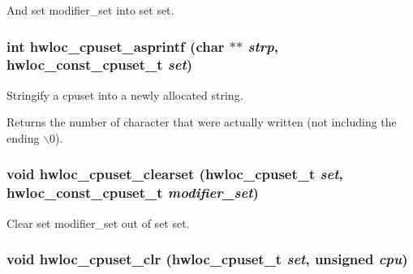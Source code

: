 And set {\ttfamily modifier\_\-set} into set {\ttfamily set}. \hypertarget{group__hwlocality__cpuset_ga29160016d2e89318b5db99046d93dc0a}{
\subsubsection[{hwloc\_\-cpuset\_\-asprintf}]{\setlength{\rightskip}{0pt plus 5cm}int hwloc\_\-cpuset\_\-asprintf (char $\ast$$\ast$ {\em strp}, \/  {\bf hwloc\_\-const\_\-cpuset\_\-t} {\em set})}}
\label{group__hwlocality__cpuset_ga29160016d2e89318b5db99046d93dc0a}


Stringify a cpuset into a newly allocated string. \begin{DoxyReturn}{Returns}
the number of character that were actually written (not including the ending $\backslash$0). 
\end{DoxyReturn}
\hypertarget{group__hwlocality__cpuset_gad9de58dc5695a3ab4ae12d571ea7f29f}{
\subsubsection[{hwloc\_\-cpuset\_\-clearset}]{\setlength{\rightskip}{0pt plus 5cm}void hwloc\_\-cpuset\_\-clearset ({\bf hwloc\_\-cpuset\_\-t} {\em set}, \/  {\bf hwloc\_\-const\_\-cpuset\_\-t} {\em modifier\_\-set})}}
\label{group__hwlocality__cpuset_gad9de58dc5695a3ab4ae12d571ea7f29f}


Clear set {\ttfamily modifier\_\-set} out of set {\ttfamily set}. \hypertarget{group__hwlocality__cpuset_ga9ae6610a008402bf7959234bd2044a82}{
\subsubsection[{hwloc\_\-cpuset\_\-clr}]{\setlength{\rightskip}{0pt plus 5cm}void hwloc\_\-cpuset\_\-clr ({\bf hwloc\_\-cpuset\_\-t} {\em set}, \/  unsigned {\em cpu})}}
\label{group__hwlocality__cpuset_ga9ae6610a008402bf7959234bd2044a82}


